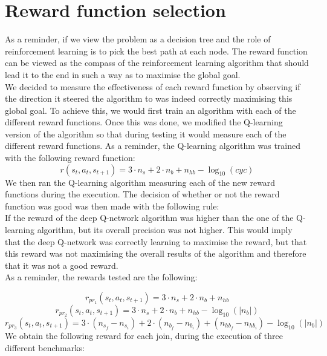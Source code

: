 \section{Reward function selection}
As a reminder, if we view the problem as a decision tree and the role of reinforcement learning is to pick the best path at each node. The reward function can be viewed as the compass of the reinforcement learning algorithm that should lead it to the end in such a way as to maximise the global goal.\\
We decided to measure the effectiveness of each reward function by observing if the direction it steered the algorithm to was indeed correctly maximising this global goal. To achieve this, we would first train an algorithm with each of the different reward functions. Once this was done, we modified the Q-learning version of the algorithm so that during testing it would measure each of the different reward functions. As a reminder, the Q-learning algorithm was trained with the following reward function:
\begin{equation}
	r(s_t,a_t,s_{t+1}) = 3  \cdot n_s + 2 \cdot n_b + n_{hb} - \log_{10}(cyc)
\end{equation}
We then ran the Q-learning algorithm measuring each of the new reward functions during the execution. The decision of whether or not the reward function was good was then made with the following rule:\\
If the reward of the deep Q-network algorithm was higher than the one of the Q-learning algorithm, but its overall precision was not higher. This would imply that the deep Q-network was correctly learning to maximise the reward, but that this reward was not maximising the overall results of the algorithm and therefore that it was not a good reward.\\
As a reminder, the rewards tested are the following:
 
\begin{equation}
        r_{pr_1}(s_t,a_t,s_{t+1}) = 3  \cdot n_s + 2 \cdot n_b + n_{hb}
\end{equation}
\begin{equation}
        r_{pr_2}(s_t,a_t,s_{t+1}) = 3  \cdot n_s + 2 \cdot n_b + n_{hb} - \log_{10}(|n_b|)
\end{equation}
\begin{equation}
        r_{pr_3}(s_t,a_t,s_{t+1}) = 3  \cdot (n_{s_f} - n_{s_i}) + 2 \cdot (n_{b_f} - n_{b_i}) + (n_{hb_f} - n_{hb_i}) - \log_{10}(|n_b|)
\end{equation}
We obtain the following reward for each join, during the execution of three different benchmarks: 

